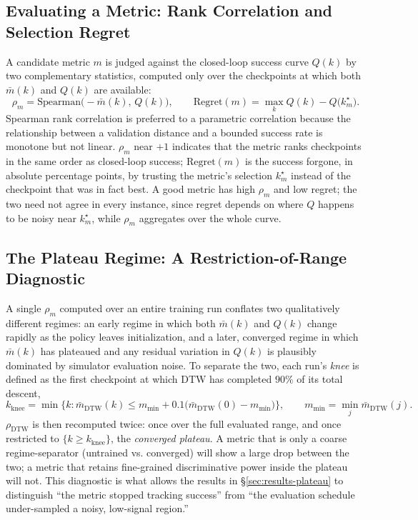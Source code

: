 \documentclass[11pt]{article}
\numberwithin{equation}{section}
\numberwithin{table}{section}
\numberwithin{figure}{section}
\begin{document}
\subsection{Evaluating a Metric: Rank Correlation and Selection Regret}
\label{sec:method-eval}

A candidate metric $m$ is judged against the closed-loop success curve $Q(k)$ by two complementary
statistics, computed only over the checkpoints at which both $\bar m(k)$ and $Q(k)$ are available:
\begin{equation}
  \rho_m = \mathrm{Spearman}\big(-\bar m(k),\,Q(k)\big),
  \qquad
  \mathrm{Regret}(m) = \max_k Q(k) - Q\big(k_m^\star\big).
  \label{eq:rho-regret}
\end{equation}
Spearman rank correlation \cite{spearman1904} is preferred to a parametric correlation because the
relationship between a validation distance and a bounded success rate is monotone but not linear.
$\rho_m$ near $+1$ indicates that the metric ranks checkpoints in the same order as closed-loop success;
$\mathrm{Regret}(m)$ is the success forgone, in absolute percentage points, by trusting the metric's
selection $k_m^\star$ instead of the checkpoint that was in fact best. A good metric has high $\rho_m$
and low regret; the two need not agree in every instance, since regret depends on where $Q$ happens to be
noisy near $k_m^\star$, while $\rho_m$ aggregates over the whole curve.

\subsection{The Plateau Regime: A Restriction-of-Range Diagnostic}
\label{sec:method-plateau}

A single $\rho_m$ computed over an entire training run conflates two qualitatively different regimes: an
early regime in which both $\bar m(k)$ and $Q(k)$ change rapidly as the policy leaves initialization, and
a later, converged regime in which $\bar m(k)$ has plateaued and any residual variation in $Q(k)$ is
plausibly dominated by simulator evaluation noise. To separate the two, each run's \emph{knee} is defined
as the first checkpoint at which DTW has completed $90\%$ of its total descent,
\begin{equation}
  k_{\mathrm{knee}} = \min\Big\{k : \bar m_{\mathrm{DTW}}(k) \le m_{\min} + 0.1\big(\bar
  m_{\mathrm{DTW}}(0)-m_{\min}\big)\Big\}, \qquad m_{\min}=\min_j \bar m_{\mathrm{DTW}}(j).
  \label{eq:knee}
\end{equation}
$\rho_{\mathrm{DTW}}$ is then recomputed twice: once over the full evaluated range, and once restricted
to $\{k\ge k_{\mathrm{knee}}\}$, the \emph{converged plateau}. A metric that is only a coarse
regime-separator (untrained vs. converged) will show a large drop between the two; a metric that retains
fine-grained discriminative power inside the plateau will not. This diagnostic is what allows the
results in \S\ref{sec:results-plateau} to distinguish ``the metric stopped tracking success'' from ``the
evaluation schedule under-sampled a noisy, low-signal region.''
\end{document}
